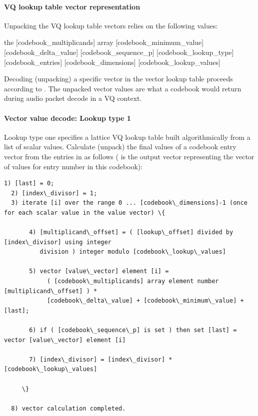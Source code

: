 \paragraph{VQ lookup table vector representation}

Unpacking the VQ lookup table vectors relies on the following values:
\begin{programlisting}
the [codebook\_multiplicands] array
[codebook\_minimum\_value]
[codebook\_delta\_value]
[codebook\_sequence\_p]
[codebook\_lookup\_type]
[codebook\_entries]
[codebook\_dimensions]
[codebook\_lookup\_values]
\end{programlisting}

\bigskip

Decoding (unpacking) a specific vector in the vector lookup table
proceeds according to .  The unpacked
vector values are what a codebook would return during audio packet
decode in a VQ context.

\paragraph{Vector value decode: Lookup type 1}

Lookup type one specifies a lattice VQ lookup table built
algorithmically from a list of scalar values.  Calculate (unpack) the
final values of a codebook entry vector from the entries in
 as follows (
is the output vector representing the vector of values for entry number
 in this codebook):

\begin{Verbatim}[commandchars=\\\{\}]
  1) [last] = 0;
  2) [index\_divisor] = 1;
  3) iterate [i] over the range 0 ... [codebook\_dimensions]-1 (once for each scalar value in the value vector) \{

       4) [multiplicand\_offset] = ( [lookup\_offset] divided by [index\_divisor] using integer
          division ) integer modulo [codebook\_lookup\_values]

       5) vector [value\_vector] element [i] =
            ( [codebook\_multiplicands] array element number [multiplicand\_offset] ) *
            [codebook\_delta\_value] + [codebook\_minimum\_value] + [last];

       6) if ( [codebook\_sequence\_p] is set ) then set [last] = vector [value\_vector] element [i]

       7) [index\_divisor] = [index\_divisor] * [codebook\_lookup\_values]

     \}

  8) vector calculation completed.
\end{Verbatim}



